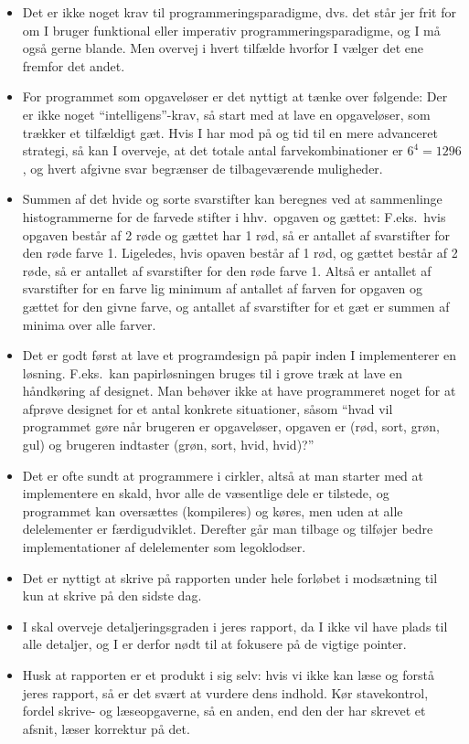   \begin{itemize}
  \item Det er ikke noget krav til programmeringsparadigme, dvs. det står jer frit for om I bruger funktional eller imperativ programmeringsparadigme, og I må også gerne blande. Men overvej i hvert tilfælde hvorfor I vælger det ene fremfor det andet.
  \item For programmet som opgaveløser er det nyttigt at tænke over følgende: Der er ikke noget ``intelligens''-krav, så start med at lave en opgaveløser, som trækker et tilfældigt gæt. Hvis I har mod på og tid til en mere advanceret strategi, så kan I overveje, at det totale antal farvekombinationer er $6^4=1296$, og hvert afgivne svar begrænser de tilbageværende muligheder.
  \item Summen af det hvide og sorte svarstifter kan beregnes ved at sammenlinge histogrammerne for de farvede stifter i hhv.\ opgaven og gættet: F.eks.\ hvis opgaven består af 2 røde og gættet har 1 rød, så er antallet af svarstifter for den røde farve 1. Ligeledes, hvis opaven består af 1 rød, og gættet består af 2 røde, så er antallet af svarstifter for den røde farve 1. Altså er antallet af svarstifter for en farve lig minimum af antallet af farven for opgaven og gættet for den givne farve, og antallet af svarstifter for et gæt er summen af minima over alle farver. 
  \item Det er godt først at lave et programdesign på papir inden I implementerer en løsning. F.eks.\ kan papirløsningen bruges til i grove træk at lave en håndkøring af designet. Man behøver ikke at have programmeret noget for at afprøve designet for et antal konkrete situationer, såsom ``hvad vil programmet gøre når brugeren er opgaveløser, opgaven er (rød, sort, grøn, gul) og brugeren indtaster (grøn, sort, hvid, hvid)?''
  \item Det er ofte sundt at programmere i cirkler, altså at man starter med at implementere en skald, hvor alle de væsentlige dele er tilstede, og programmet kan oversættes (kompileres) og køres, men uden at alle delelementer er færdigudviklet. Derefter går man tilbage og tilføjer bedre implementationer af delelementer som legoklodser.
  \item Det er nyttigt at skrive på rapporten under hele forløbet i modsætning til kun at skrive på den sidste dag.
  \item I skal overveje detaljeringsgraden i jeres rapport, da I ikke vil have plads til alle detaljer, og I er derfor nødt til at fokusere på de vigtige pointer.
  \item Husk at rapporten er et produkt i sig selv: hvis vi ikke kan læse og forstå jeres rapport, så er det svært at vurdere dens indhold. Kør stavekontrol, fordel skrive- og læseopgaverne, så en anden, end den der har skrevet et afsnit, læser korrektur på det.

\end{itemize}
